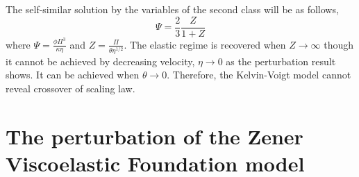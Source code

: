 \documentclass[aps,prl,superscriptaddress]{revtex4}  %
\begin{document}
The self-similar solution by the variables of the second class will be as follows,
\begin{equation}
\Psi =\frac{2}{3}\frac{Z}{1+Z}
\label{eq:ES22}
\end{equation}
where $\Psi = \frac{\phi \Pi^3}{\kappa \eta}$ and $Z = \frac{\Pi}{\theta \eta^{1/2}}$. The elastic regime is recovered when $Z \rightarrow \infty$ though it cannot be achieved by decreasing velocity, $\eta \rightarrow 0$ as the perturbation result shows. It can be achieved when $\theta \rightarrow 0$. Therefore, the Kelvin-Voigt model cannot reveal crossover of scaling law.

\section{The perturbation of the Zener Viscoelastic Foundation model}
\end{document}
